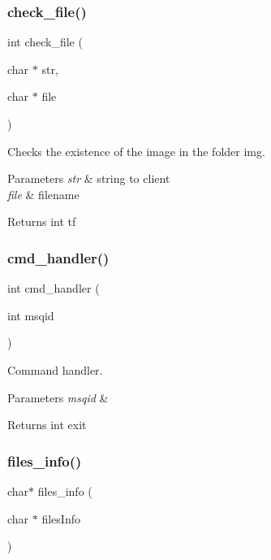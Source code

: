 \subsubsection{check\+\_\+file()}
{\footnotesize\ttfamily int check\+\_\+file (\begin{DoxyParamCaption}\item[{char $\ast$}]{str,  }\item[{char $\ast$}]{file }\end{DoxyParamCaption})}



Checks the existence of the image in the folder img. 


\begin{DoxyParams}{Parameters}
{\em str} & string to client \\
\hline
{\em file} & filename \\
\hline
\end{DoxyParams}
\begin{DoxyReturn}{Returns}
int tf 
\end{DoxyReturn}
\mbox{\label{fileserv_8c_a975d9337db509c0204b110f51d723160}} 
\subsubsection{cmd\+\_\+handler()}
{\footnotesize\ttfamily int cmd\+\_\+handler (\begin{DoxyParamCaption}\item[{int}]{msqid }\end{DoxyParamCaption})}



Command handler. 


\begin{DoxyParams}{Parameters}
{\em msqid} & \\
\hline
\end{DoxyParams}
\begin{DoxyReturn}{Returns}
int exit 
\end{DoxyReturn}
\mbox{\label{fileserv_8c_a28f9a6d37e4dbc8b5bf5fad1025285e3}} 
\subsubsection{files\+\_\+info()}
{\footnotesize\ttfamily char$\ast$ files\+\_\+info (\begin{DoxyParamCaption}\item[{char $\ast$}]{files\+Info }\end{DoxyParamCaption})}



